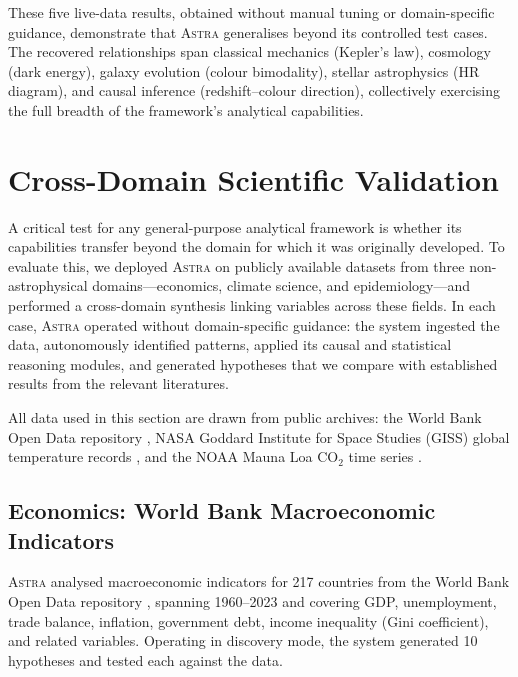 \documentclass[fleqn,usenatbib]{mnras}
\newcommand{\astra}{\textsc{Astra}\xspace}
\begin{document}
\medskip

These five live-data results, obtained without manual tuning or domain-specific guidance, demonstrate that \astra generalises beyond its controlled test cases.
The recovered relationships span classical mechanics (Kepler's law), cosmology (dark energy), galaxy evolution (colour bimodality), stellar astrophysics (HR diagram), and causal inference (redshift--colour direction), collectively exercising the full breadth of the framework's analytical capabilities.

\section{Cross-Domain Scientific Validation}
\label{sec:crossdomain}

A critical test for any general-purpose analytical framework is whether its capabilities transfer beyond the domain for which it was originally developed.
To evaluate this, we deployed \astra on publicly available datasets from three non-astrophysical domains---economics, climate science, and epidemiology---and performed a cross-domain synthesis linking variables across these fields.
In each case, \astra operated without domain-specific guidance: the system ingested the data, autonomously identified patterns, applied its causal and statistical reasoning modules, and generated hypotheses that we compare with established results from the relevant literatures.

All data used in this section are drawn from public archives: the World Bank Open Data repository \citep{WorldBank2024}, NASA Goddard Institute for Space Studies (GISS) global temperature records \citep{Hansen2010}, and the NOAA Mauna Loa CO$_{2}$ time series \citep{NOAA2024}.

\subsection{Economics: World Bank Macroeconomic Indicators}
\label{sec:crossdomain:economics}

\astra analysed macroeconomic indicators for 217 countries from the World Bank Open Data repository \citep{WorldBank2024}, spanning 1960--2023 and covering GDP, unemployment, trade balance, inflation, government debt, income inequality (Gini coefficient), and related variables.
Operating in discovery mode, the system generated 10 hypotheses and tested each against the data.
\end{document}
